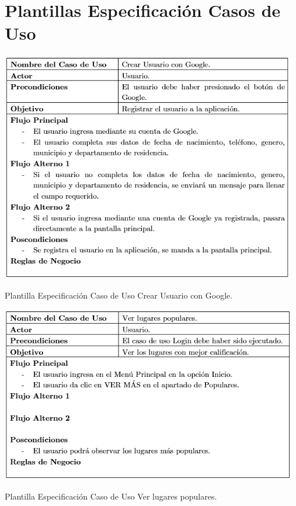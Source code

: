 \documentclass[12pt,letterpaper,openany]{book}
\begin{document}
\chapter{Plantillas Especificación Casos de Uso}\label{aped.B}
\begin{table}[H]
\centering
\includegraphics[width=13cm]{./imagenes/PCU/crear_usuario_google}
\caption{Plantilla Especificación Caso de Uso Crear Usuario con Google.}
\end{table}

\begin{table}[H]
\centering
\includegraphics[width=13cm]{./imagenes/PCU/ver_lugares_populares}
\caption{Plantilla Especificación Caso de Uso Ver lugares populares.}
\end{table}
\end{document}
